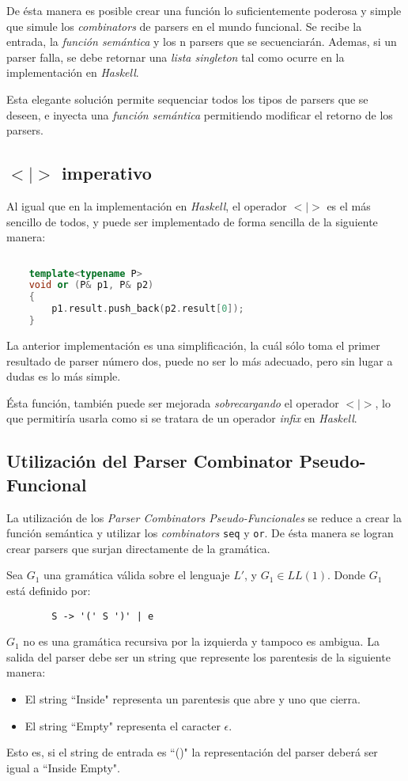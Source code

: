 	De ésta manera es posible crear una función lo suficientemente poderosa y simple que simule los \emph{combinators} de parsers en el mundo funcional. Se recibe la entrada, la \emph{función semántica} y los n parsers que se secuenciarán. Ademas, si un parser falla, se debe retornar una \emph{lista singleton} tal como ocurre en la implementación en \emph{Haskell}.
	
	Esta elegante solución permite sequenciar todos los tipos de parsers que se deseen, e inyecta una \emph{función semántica} permitiendo modificar el retorno de los parsers.
	
	\subsection{$<|>$ imperativo}
	Al igual que en la implementación en \emph{Haskell}, el operador $<|>$ es el más sencillo de todos, y puede ser implementado de forma sencilla de la siguiente manera:
	\begin{lstlisting}[language=C++, caption=función de elección en C++]
	
	template<typename P>
	void or (P& p1, P& p2)
	{
		p1.result.push_back(p2.result[0]);
	}	
	\end{lstlisting}
	
	La anterior implementación es una simplificación, la cuál sólo toma el primer resultado de parser número dos, puede no ser lo más adecuado, pero sin lugar a dudas es lo más simple.
	
	Ésta función, también puede ser mejorada \emph{sobrecargando} el operador $<|>$, lo que permitiría usarla como si se tratara de un operador \emph{infix} en \emph{Haskell}.
	
	\subsection{Utilización del Parser Combinator Pseudo-Funcional}
	La utilización de los \emph{Parser Combinators Pseudo-Funcionales} se reduce a crear la función semántica y utilizar los \emph{combinators} \texttt{seq} y \texttt{or}. De ésta manera se logran crear parsers que surjan directamente de la gramática.
	
	\begin{exmp}
		Sea $G_1$ una gramática válida sobre el lenguaje $L'$, y $G_1 \in LL(1)$.
		Donde $G_1$ está definido por:
		
		\begin{lstlisting}
		S -> '(' S ')' | e
		\end{lstlisting}
		
		$G_1$ no es una gramática recursiva por la izquierda y tampoco es ambigua.
		La salida del parser debe ser un string que represente los parentesis de la siguiente manera:
		\begin{itemize}
			\item El string ``Inside" representa un parentesis que abre y uno que cierra.
			\item El string ``Empty" representa el caracter $\epsilon$.
		\end{itemize}
		Esto es, si el string de entrada es ``()" la representación del parser deberá ser igual a ``Inside Empty".		
	\end{exmp}
	
